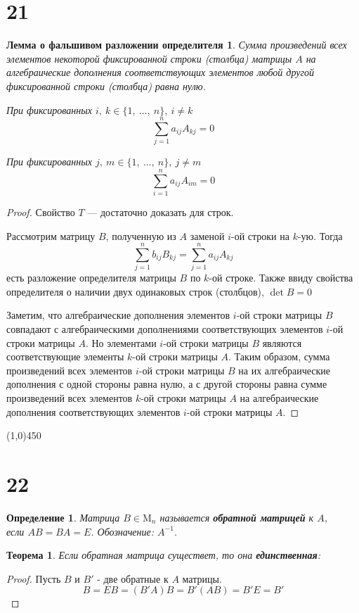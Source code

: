 \documentclass[a4paper,12pt]{article}
\newcommand{\M}{\mathrm{M}}
\newtheorem*{definition}{Определение}
\newtheorem*{theorem}{Теорема}
\newtheorem*{fake-determinant}{Лемма о фальшивом разложении определителя}
\begin{document}
	\section*{21}
	\begin{fake-determinant}
		Сумма произведений всех элементов некоторой фиксированной строки (столбца) матрицы $A$ на алгебраические дополнения соответствующих элементов любой другой фиксированной строки (столбца) равна нулю.
		\vspace{0.5cm}
		
		При фиксированных $i,\ k \in \{1,\ \ldots,\ n\},\ i \ne k$
		$$ \sum_{j=1}^n a_{ij} A_{kj} = 0 $$
		
		При фиксированных $j,\ m \in \{1,\ \ldots,\ n\},\ j \ne m$
		$$ \sum_{i=1}^n a_{ij} A_{im} = 0 $$
	\end{fake-determinant}
	
	\begin{proof}
		Свойство $T$ --- достаточно доказать для строк.
		
		Рассмотрим матрицу $B$, полученную из $A$ заменой $i$-ой строки на $k$-ую.
		Тогда  
		\[
		\sum_{j=1}^n b_{ij} B_{kj} = 
		\sum_{j=1}^n a_{ij} A_{kj}
		\]
		есть разложение определителя матрицы $B$ по $k$-ой строке.
		Также ввиду свойства определителя о наличии двух одинаковых строк (столбцов), $\det{B} = 0$
		
		Заметим, что алгебраические дополнения элементов $i$-ой строки матрицы $B$ совпадают с алгебраическими дополнениями соответствующих элементов $i$-ой строки матрицы $A$. 
		Но элементами $i$-ой строки матрицы $B$ являются соответствующие элементы $k$-ой строки матрицы $A$. 
		Таким образом, сумма произведений всех элементов $i$-ой строки матрицы $B$ на их алгебраические дополнения с одной стороны равна нулю, 
		а с другой стороны равна сумме произведений всех элементов $k$-ой строки матрицы $A$ на алгебраические дополнения соответствующих элементов $i$-ой строки матрицы $A$.
	\end{proof}
	\begin{center}
		\line(1,0){450}
	\end{center}
	\section*{22}
	\begin{definition}
		Матрица $B \in \M_n$ называется \textbf{обратной матрицей} к $A$,\\ если $AB = BA = E$. Обозначение: $A^{-1}$.
	\end{definition}
	\begin{theorem}
		Если обратная матрица существет, то она \textbf{единственная}:
	\end{theorem}
	\begin{proof}
		Пусть $B$ и $B'$ - две обратные к $A$ матрицы.
		\[B = EB = (B'A)B = B'(AB) = B'E = B'\]
	\end{proof}
	
\end{document}

